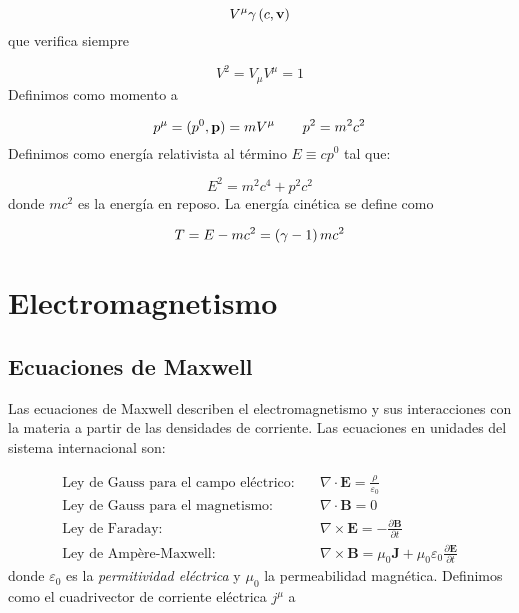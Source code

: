 \begin{equation}
	V^\mu  \gamma \left( c,\mathbf{v} \right) 
\end{equation}
que verifica siempre 

\begin{equation}
	V^2 = V_\mu V^\mu = 1
\end{equation}
Definimos como momento a

\begin{equation}
	p^\mu = (p^0,\mathbf{p}) = m V^\mu \qquad p^2 = m^2 c^2 
\end{equation}
Definimos como energía relativista al término $E\equiv cp^0$ tal que:

\begin{equation}
	E^2 = m^2 c^4 + p^2 c^2
\end{equation}
donde $mc^2$ es la energía en reposo. La energía cinética se define como 

\begin{equation}
	T=E-mc^2 = \left( \gamma-1 \right)mc^2
\end{equation}



\section{Electromagnetismo}

\subsection{Ecuaciones de Maxwell}

Las ecuaciones de Maxwell describen el electromagnetismo y sus interacciones con la materia a partir de las densidades de corriente.  Las ecuaciones en unidades del sistema internacional son:

\begin{equation}
	\begin{aligned}
		\text{Ley de Gauss para el campo eléctrico:} \quad & \nabla \cdot \mathbf{E} = \frac{\rho}{\varepsilon_0} \\
		\text{Ley de Gauss para el magnetismo:} \quad & \nabla \cdot \mathbf{B} = 0 \\
		\text{Ley de Faraday:} \quad & \nabla \times \mathbf{E} = -\frac{\partial \mathbf{B}}{\partial t} \\
		\text{Ley de Ampère-Maxwell:} \quad & \nabla \times \mathbf{B} = \mu_0 \mathbf{J} + \mu_0 \varepsilon_0 \frac{\partial \mathbf{E}}{\partial t}
	\end{aligned}
\end{equation}
donde $\varepsilon_0$ es la \textit{permitividad eléctrica} y $\mu_0$ la permeabilidad magnética. Definimos como el cuadrivector de corriente eléctrica $j^\mu$ a

